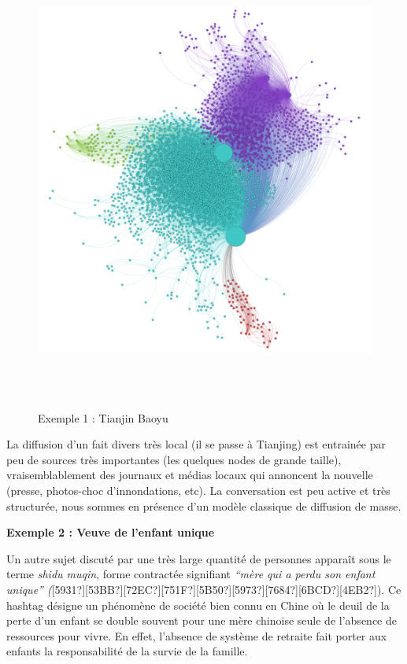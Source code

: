 \begin{figure}
    \centering
    \includegraphics[width=6.0114in,height=6.0114in]{figures/chap3/chapitre3-img17.png}
    \caption{Exemple 1 : Tianjin Baoyu}
\end{figure}

La diffusion d{\textquoteright}un fait divers tr\`es local (il se passe
\`a Tianjing) est entrain\'ee par peu de sources tr\`es importantes
(les quelques nodes de grande taille), vraisemblablement des journaux
et m\'edias locaux qui annoncent la nouvelle (presse, photos-choc
d{\textquoteright}innondations, etc). La conversation est peu active et
tr\`es structur\'ee, nous sommes en pr\'esence d{\textquoteright}un
mod\`ele classique de diffusion de masse.

\textbf{Exemple 2 : Veuve de l{\textquoteright}enfant unique}

Un autre sujet discut\'e par une tr\`es large quantit\'e de personnes
appara\^it sous le terme {\textquotedbl}\textit{shidu
muqin}{\textquotedbl}, forme contract\'ee signifiant
\textit{{\textquotedblleft}m\`ere qui a perdu son enfant
unique{\textquotedblright}
(}[5931?][53BB?][72EC?][751F?][5B50?][5973?][7684?][6BCD?][4EB2?]). Ce
hashtag d\'esigne un ph\'enom\`ene de soci\'et\'e bien connu en Chine
o\`u le deuil de la perte d{\textquoteright}un enfant se double souvent
pour une m\`ere chinoise seule de l{\textquoteright}absence de
ressources pour vivre. En effet, l{\textquoteright}absence de syst\`eme
de retraite fait porter aux enfants la responsabilit\'e de la survie de
la famille. 


